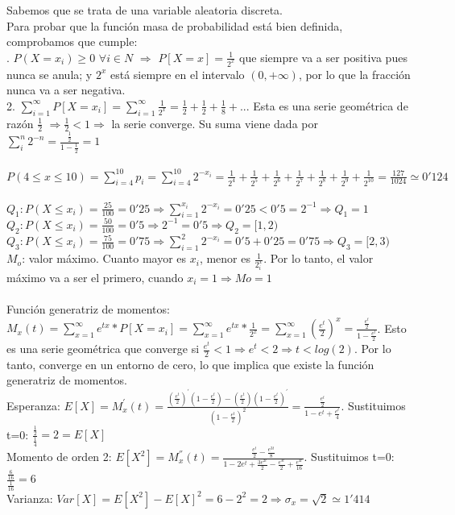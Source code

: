 Sabemos que se trata de una variable aleatoria discreta. \\
Para probar que la función masa de probabilidad está bien definida, comprobamos que cumple: \\
. $P(X=x_i)\geq 0$ $\forall i\in N$ $\Rightarrow$ $P[X=x]=\frac{1}{2^x}$ que siempre va a ser positiva pues nunca se anula; y $2^x$ está siempre en el intervalo $(0,+\infty)$, por lo que la fracción nunca va a ser negativa. \\
2. $\sum_{i=1}^{\infty}P[X=x_i]=\sum_{i=1}^{\infty}\frac{1}{2^x} = \frac{1}{2} + \frac{1}{2} + \frac{1}{8} + ... $ Esta es una serie geométrica de razón $\frac{1}{2}$ $\Rightarrow \frac{1}{2} < 1 \Rightarrow$ la serie converge. Su suma viene dada por $\sum_{i}^n 2^{-n} = \frac{\frac{1}{2}}{1-\frac{1}{2}}=1$ \\ \\
\subproblem
$P(4\leq x \leq 10) = \sum^{10}_{i=4} p_i = \sum^{10}_{i=4} 2^{-x_i} = \frac{1}{2^4}+\frac{1}{2^5}+ \frac{1}{2^6} + \frac{1}{2^7} + \frac{1}{2^8} + \frac{1}{2^9}+ \frac{1}{2^{10}} = \frac{127}{1024} \simeq 0'124$ \\ \\
\subproblem
$Q_1: P(X\leq x_i) = \frac{25}{100} = 0'25 \Rightarrow \sum^{x_i}_{i=1} 2^{-x_i} = 0'25 < 0'5 = 2^{-1} \Rightarrow Q_1 = 1$ \\
$Q_2: P(X \leq x_i) = \frac{50}{100} = 0'5 \Rightarrow 2^{-1} = 0'5 \Rightarrow Q_2 = [1,2)$ \\
$Q_3: P(X \leq x_i) = \frac{75}{100} = 0'75 \Rightarrow \sum^2_{i=1} 2^{-x_i} = 0'5 + 0'25 = 0'75 \Rightarrow Q_3 = [2,3)$ \\
$M_o$: valor máximo. Cuanto mayor es $x_i$, menor es $\frac{1}{2^x_i}$. Por lo tanto, el valor máximo va a ser el primero, cuando $x_i = 1 \Rightarrow Mo = 1$ \\ \\
\subproblem
Función generatriz de momentos: $M_x(t) = \sum^\infty_{x=1} e^{tx}*P[X=x_i] = \sum^\infty_{x=1} e^{tx}*\frac{1}{2^x} = \sum^\infty_{x=1} (\frac{e^t}{2})^x = \frac{\frac{e^t}{2}}{1-\frac{e^t}{2}}$. Esto es una serie geométrica que converge si $\frac{e^t}{2} < 1 \Rightarrow e^t < 2 \Rightarrow t < log(2)$. Por lo tanto, converge en un entorno de cero, lo que implica que existe la función generatriz de momentos. \\
Esperanza: $E[X] = M^{'} _x(t) = \frac{(\frac{e^t}{2})^{'}(1-\frac{e^t}{2})-(\frac{e^t}{2})(1-\frac{e^t}{2})^{'}}{(1-\frac{e^t}{2})^2} = \frac{\frac{e^t}{2}}{1 - e^t + \frac{e^t}{4}}$. Sustituimos t=0: $\frac{\frac{1}{2}}{\frac{1}{4}} = 2 = E[X]$ \\
Momento de orden 2: $E[X^2] = M^{''}_x(t) = \frac{\frac{e^t}{2}-\frac{e^{3t}}{8}}{1-2e^t+\frac{3e^{2t}}{2}-\frac{e^{3t}}{2}+\frac{e^{4t}}{16}}$. Sustituimos t=0: $\frac{\frac{6}{16}}{\frac{1}{16}} = 6$ \\
Varianza: $Var[X] = E[X^2]-E[X]^2 = 6-2^2 = 2 \Rightarrow \sigma_x = \sqrt{2} \simeq 1'414$

